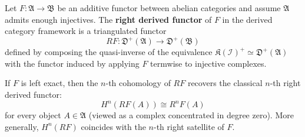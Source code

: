Let $F: \mathfrak{A} \to \mathfrak{B}$ be an additive functor between abelian categories and assume $\mathfrak{A}$ admits enough injectives. The \textbf{right derived functor} of $F$ in the derived category framework is a triangulated functor
$$
RF: \mathfrak{D}^{+}(\mathfrak{A}) \longrightarrow \mathfrak{D}^{+}(\mathfrak{B})
$$
defined by composing the quasi-inverse of the equivalence $\mathfrak{K}(\mathcal{I})^{+} \simeq \mathfrak{D}^{+}(\mathfrak{A})$ with the functor induced by applying $F$ termwise to injective complexes.

If $F$ is left exact, then the $n$-th cohomology of $RF$ recovers the classical $n$-th right derived functor:
$$
H^n(RF(A)) \cong R^n F(A)
$$
for every object $A \in \mathfrak{A}$ (viewed as a complex concentrated in degree zero). More generally, $H^n(RF)$ coincides with the $n$-th right satellite of $F$.
